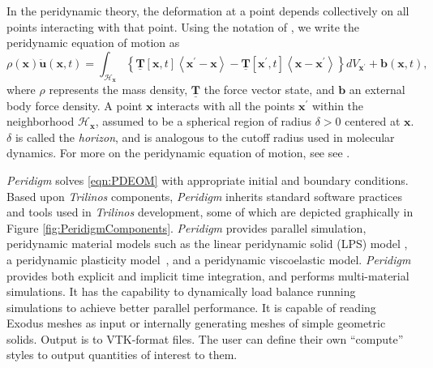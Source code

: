 \documentclass[10pt]{article}
\theoremstyle{plain}
\theoremstyle{definition}
\theoremstyle{remark}
\numberwithin{equation}{section}
\begin{document}
In the peridynamic theory, the deformation at a point depends collectively on all points interacting with that point. Using the notation of \cite{Silling:2007:PDStates}, we write the peridynamic equation of motion as
\begin{equation} \label{eqn:PDEOM}
\rho(\mathbf{x}) \ddot{\mathbf{u}}(\mathbf{x},t) = \int_{\mathcal{H}_{\mathbf{x}}}
\left\{ \underline{\mathbf{T}}\left[ \mathbf{x},t \right]\left<\mathbf{x}^{\prime}-\mathbf{x} \right>
 - \underline{\mathbf{T}}\left[\mathbf{x}^{\prime},t \right]\left<\mathbf{x}-\mathbf{x}^{\prime} \right> \right\}
{d}V_{\mathbf{x}^\prime} + \mathbf{b}(\mathbf{x},t),
\end{equation}
where $\rho$ represents the mass density, $\underline{\mathbf{T}}$ the force vector state, and $\mathbf{b}$ an external body force density. A point $\mathbf{x}$ interacts with all the points $\mathbf{x}^{\prime}$ within the neighborhood $\mathcal{H}_{\mathbf{x}}$, assumed to be a spherical region of radius $\delta>0$ centered at $\mathbf{x}$. $\delta$ is called the {\em horizon}, and is analogous to the cutoff radius used in molecular dynamics. For more on the peridynamic equation of motion, see see \cite{Silling:2007:PDStates}.

\emph{Peridigm} solves \eqref{eqn:PDEOM} with appropriate initial and boundary conditions. Based upon \emph{Trilinos} components, \emph{Peridigm} inherits standard software practices and tools used in \emph{Trilinos} development, some of which are depicted graphically in Figure \ref{fig:PeridigmComponents}. \emph{Peridigm} provides parallel simulation, peridynamic material models such as the linear peridynamic solid (LPS) model \cite{Silling:2007:PDStates}, a peridynamic plasticity model~\cite{Mitchell:2011:Plasticity}, and a peridynamic viscoelastic model. \emph{Peridigm} provides both explicit and implicit time integration, and performs multi-material simulations. It has the capability to dynamically load balance running simulations to achieve better parallel performance. It is capable of reading Exodus meshes as input or internally generating meshes of simple geometric solids. Output is to VTK-format files. The user can define their own ``compute'' styles to output quantities of interest to them.
\end{document}
